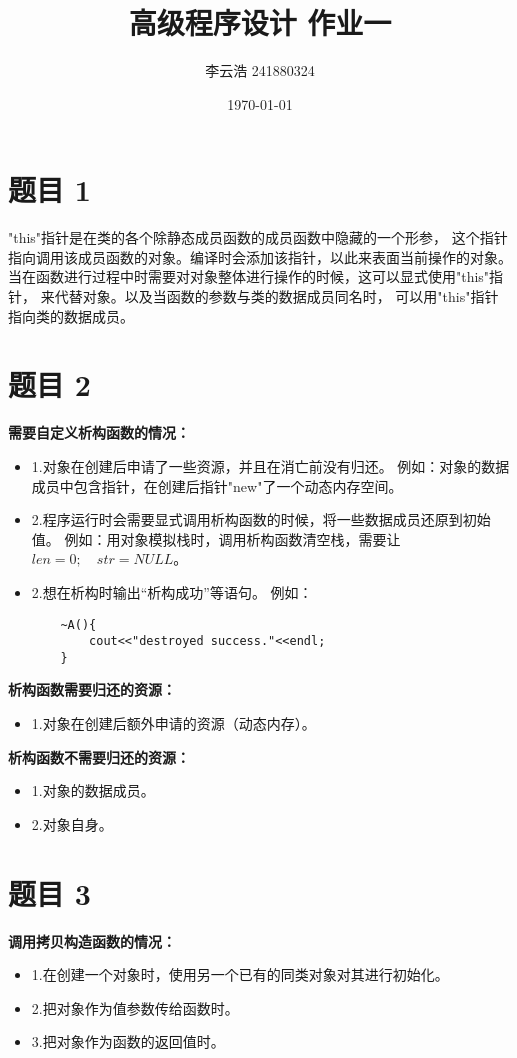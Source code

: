 \documentclass{article}
\title{高级程序设计 作业一}
\author{李云浩 241880324}
\date{\today}
\begin{document}
\maketitle
\section{题目 1}
"this"指针是在类的各个除静态成员函数的成员函数中隐藏的一个形参，
这个指针指向调用该成员函数的对象。编译时会添加该指针，以此来表面当前操作的对象。
当在函数进行过程中时需要对对象整体进行操作的时候，这可以显式使用"this"指针，
来代替对象。以及当函数的参数与类的数据成员同名时，
可以用"this"指针指向类的数据成员。

\section{题目 2}
\textbf{需要自定义析构函数的情况：}
\begin{itemize}
    \item 1.对象在创建后申请了一些资源，并且在消亡前没有归还。
    例如：对象的数据成员中包含指针，在创建后指针"new"了一个动态内存空间。
    \item 2.程序运行时会需要显式调用析构函数的时候，将一些数据成员还原到初始值。
    例如：用对象模拟栈时，调用析构函数清空栈，需要让$len = 0; \quad str = NULL$。
    \item 2.想在析构时输出“析构成功”等语句。
    例如：
    \begin{lstlisting}
    ~A(){
        cout<<"destroyed success."<<endl;
    }
    \end{lstlisting}
\end{itemize}

\textbf{析构函数需要归还的资源：}
\begin{itemize}
    \item 1.对象在创建后额外申请的资源（动态内存）。
\end{itemize}

\textbf{析构函数不需要归还的资源：}
\begin{itemize}
    \item 1.对象的数据成员。
    \item 2.对象自身。
\end{itemize}

\section{题目 3}
\textbf{调用拷贝构造函数的情况：}
\begin{itemize}
    \item 1.在创建一个对象时，使用另一个已有的同类对象对其进行初始化。
    \item 2.把对象作为值参数传给函数时。
    \item 3.把对象作为函数的返回值时。
\end{itemize}
\end{document}

